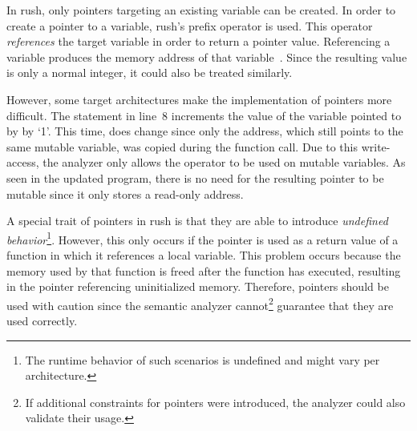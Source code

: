 In rush, only pointers targeting an existing variable can be created.
In order to create a pointer to a variable, rush's \qVerb{&} prefix operator is used.
This operator \emph{references} the target variable in order to return a pointer value.
Referencing a variable produces the memory address of that variable~\cite[p.~95]{Ritchie1988}.
Since the resulting value is only a normal integer, it could also be treated similarly.

However, some target architectures make the implementation of pointers more difficult.
The statement in line~8 increments the value of the variable pointed to by  by `1'.
This time,  does change since only the address, which still points to the same mutable variable, was copied during the function call.
Due to this write-access, the analyzer only allows the \qVerb{&} operator to be used on mutable variables.
As seen in the updated program, there is no need for the resulting pointer to be mutable since it only stores a read-only address.

A special trait of pointers in rush is that they are able to introduce \emph{undefined behavior}\footnote{The runtime behavior of such scenarios is undefined and might vary per architecture.}.
However, this only occurs if the pointer is used as a return value of a function in which it references a local variable.
This problem occurs because the memory used by that function is freed after the function has executed, resulting in the pointer referencing uninitialized memory.
Therefore, pointers should be used with caution since the semantic analyzer cannot\footnote{If additional constraints for pointers were introduced, the analyzer could also validate their usage.} guarantee that they are used correctly.
